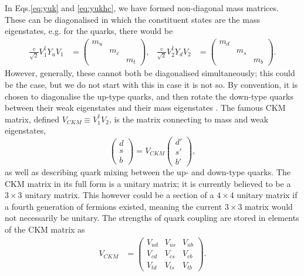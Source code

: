 \documentclass[a4paper,12pt]{article}
\begin{document}
In Eqs.\eqref{eq:yuk} and \eqref{eq:yukhc}, we have formed non-diagonal mass matrices. 
These can be diagonalised in which the constituent states are the mass eigenstates, e.g. for the quarks, there would be 
\begin{align}
    \label{eq:massmat}
    \frac{v}{\sqrt{2}}V_1^\dagger Y_uV_1 &= \begin{pmatrix} m_u & & \\ & m_c & \\ & & m_t\end{pmatrix}, & \frac{v}{\sqrt{2}}V_2^\dagger Y_dV_2 &= \begin{pmatrix} m_d & & \\ & m_s & \\ & & m_b\end{pmatrix}.
\end{align}
However, generally, these cannot both be diagonalised simultaneously; this could be the case, but we do not start with this in case it is not so. %
By convention, it is chosen to diagonalise the up-type quarks, and then rotate the down-type quarks between their weak eigenstates and their mass eigenstates \cite{l}. 
The famous CKM matrix, defined $V_{CKM}\equiv V_1^\dagger V_2$, is the matrix connecting to mass and weak eigenstates,
\begin{equation}
    \label{eq:ckmone}
    \begin{pmatrix} d \\ s \\ b\end{pmatrix} = V_{CKM}\begin{pmatrix} d' \\ s' \\ b'\end{pmatrix},
\end{equation}
as well as describing quark mixing between the up- and down-type quarks. 
The CKM matrix in its full form is a unitary matrix; it is currently believed to be a $3\times3$ unitary matrix. 
This however could be a section of a $4\times4$ unitary matrix if a fourth generation of fermions existed, meaning the current $3\times3$ matrix would not necessarily be unitary. 
The strengths of quark coupling are stored in elements of the CKM matrix as
\begin{align}
    \label{eq:ckmub}
    V_{CKM} &= \begin{pmatrix}V_{ud}&V_{us}&V_{ub}\\V_{cd}&V_{cs}&V_{cb}\\V_{td}&V_{ts}&V_{tb}\end{pmatrix}.
\end{align}
\end{document}
